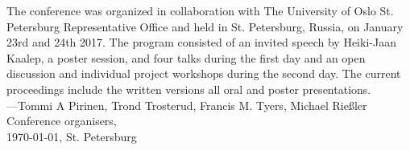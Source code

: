 \documentclass[11pt]{article}
\begin{document}
The conference was organized in collaboration with The University of Oslo St.
Petersburg Representative Office and held in St. Petersburg, Russia, on January
23rd and 24th 2017.  The program consisted of an invited speech by Heiki-Jaan
Kaalep, a poster session, and four  talks during the first day and an open
discussion and individual project workshops during the second day.  The current
proceedings include the written versions all oral and poster presentations.\\

\noindent ---Tommi A Pirinen, Trond Trosterud, Francis M. Tyers, Michael Rießler\\
Conference organisers,\\
\today, St. Petersburg
\end{document}
